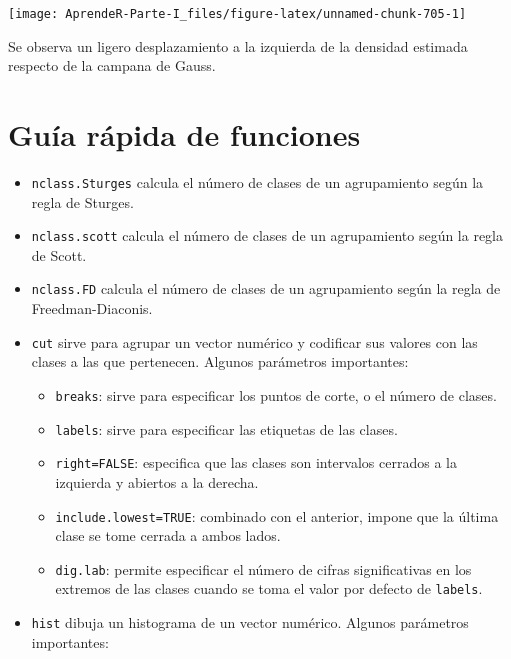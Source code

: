 \documentclass[]{book}
\providecommand{\tightlist}{%
  \setlength{\itemsep}{0pt}\setlength{\parskip}{0pt}}
\theoremstyle{definition}
\theoremstyle{definition}
\theoremstyle{definition}
\theoremstyle{remark}
\begin{document}
\begin{center}\texttt{[image: AprendeR-Parte-I\_files/figure-latex/unnamed-chunk-705-1]} \end{center}

Se observa un ligero desplazamiento a la izquierda de la densidad estimada respecto de la campana de Gauss.

\hypertarget{guia-rapida-de-funciones-7}{%
\section{Guía rápida de funciones}\label{guia-rapida-de-funciones-7}}

\begin{itemize}
\item
  \texttt{nclass.Sturges} calcula el número de clases de un agrupamiento según la regla de Sturges.
\item
  \texttt{nclass.scott} calcula el número de clases de un agrupamiento según la regla de Scott.
\item
  \texttt{nclass.FD} calcula el número de clases de un agrupamiento según la regla de Freedman-Diaconis.
\item
  \texttt{cut} sirve para agrupar un vector numérico y codificar sus valores con las clases a las que pertenecen. Algunos parámetros importantes:

  \begin{itemize}
  \tightlist
  \item
    \texttt{breaks}: sirve para especificar los puntos de corte, o el número de clases.
  \item
    \texttt{labels}: sirve para especificar las etiquetas de las clases.
  \item
    \texttt{right=FALSE}: especifica que las clases son intervalos cerrados a la izquierda y abiertos a la derecha.
  \item
    \texttt{include.lowest=TRUE}: combinado con el anterior, impone que la última clase se tome cerrada a ambos lados.
  \item
    \texttt{dig.lab}: permite especificar el número de cifras significativas en los extremos de las clases cuando se toma el valor por defecto de \texttt{labels}.
  \end{itemize}
\item
  \texttt{hist} dibuja un histograma de un vector numérico. Algunos parámetros importantes:


\end{itemize}
\end{document}
